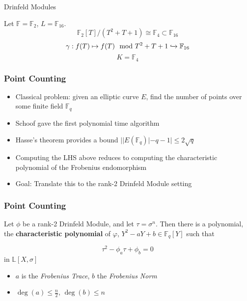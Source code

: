\documentclass{beamer}
\newcommand{\f}{\mathbb{F}}
\begin{document}
 \begin{frame}{Drinfeld Modules}
   \begin{example}
   Let $\f = \f_2$, $L = \mathbb{F}_{16}$.
   \[ \f_2[T]/(T^2 + T + 1) \cong \f_4 \subset \f_{16}\]
   \[ \gamma : f(T) \mapsto f(T) \mod T^2 + T + 1 \xhookrightarrow{} \f_{16} \]
   \[K = \f_4\]
   \end{example}

\end{frame}






\begin{frame}
\frametitle{Point Counting}

\begin{itemize}
\item Classical problem: given an elliptic curve $E$, find the number of points over some finite field $\mathbb{F}_q$ 
\item Schoof gave the first polynomial time algorithm
\item Hasse's theorem provides a bound $ | |E(\mathbb{F}_q)| - q - 1  | \leq 2 \sqrt{q} $

\item Computing the LHS above reduces to computing the characteristic polynomial of the Frobenius endomorphism

\item Goal: Translate this to the rank-2 Drinfeld Module setting
\end{itemize}

\end{frame}









\begin{frame}
\frametitle{Point Counting}

\begin{theorem}[Gekeler, 1991]
Let $\phi$ be a rank-2 Drinfeld Module, and let $\tau = \sigma^n$. Then there is a polynomial, the \textbf{characteristic polynomial} of $\varphi$,  $Y^2 - aY +b \in \mathbb{F}_q[Y]$ such that

\[\tau^2 -\phi_a\tau + \phi_b = 0\]
in $\mathbb{L}[X,\sigma]$
\end{theorem}

\begin{itemize}
    \item $a$ is the \textit{Frobenius Trace}, $b$ the \textit{Frobenius Norm}
    \item $\deg(a) \leq \frac{n}{2}$, $\deg(b) \leq n$
\end{itemize}

\end{frame}
\end{document}

